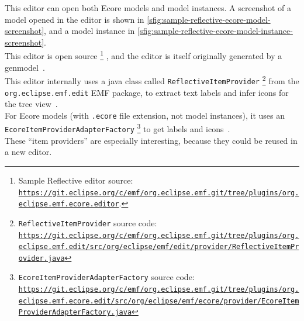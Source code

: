 This editor can open both \gls{Ecore} models and model instances.
A screenshot of a model opened in the editor is shown in \cref{sfig:sample-reflective-ecore-model-screenshot}, and a model instance in \cref{sfig:sample-reflective-ecore-model-instance-screenshot}.\\

This editor is \gls{open source}%
\footnote{Sample Reflective editor source: \href{https://git.eclipse.org/c/emf/org.eclipse.emf.git/tree/plugins/org.eclipse.emf.ecore.editor}{\nolinkurl{https://git.eclipse.org/c/emf/org.eclipse.emf.git/tree/plugins/org.eclipse.emf.ecore.editor}}.}%
, and the editor is itself originally generated by a genmodel~\cite[p.~10]{rekstadModelingEnvironmentCloud2020}.\\

This editor internally uses a java class called \texttt{ReflectiveItemProvider}%
\footnote{\texttt{ReflectiveItemProvider} source code: \href{https://git.eclipse.org/c/emf/org.eclipse.emf.git/tree/plugins/org.eclipse.emf.edit/src/org/eclipse/emf/edit/provider/ReflectiveItemProvider.java}{\nolinkurl{https://git.eclipse.org/c/emf/org.eclipse.emf.git/tree/plugins/org.eclipse.emf.edit/src/org/eclipse/emf/edit/provider/ReflectiveItemProvider.java}}}
from the \texttt{org.eclipse.emf.edit} \acrshort{EMF} package, to extract text labels and infer icons for the tree view~\cite[p.~10]{rekstadModelingEnvironmentCloud2020}.\\

For \gls{Ecore} models (with \texttt{.ecore} file extension, not model instances), it uses an \texttt{EcoreItemProviderAdapterFactory}%
\footnote{\texttt{EcoreItemProviderAdapterFactory} source code: \href{https://git.eclipse.org/c/emf/org.eclipse.emf.git/tree/plugins/org.eclipse.emf.ecore.edit/src/org/eclipse/emf/ecore/provider/EcoreItemProviderAdapterFactory.java}{\nolinkurl{https://git.eclipse.org/c/emf/org.eclipse.emf.git/tree/plugins/org.eclipse.emf.ecore.edit/src/org/eclipse/emf/ecore/provider/EcoreItemProviderAdapterFactory.java}}}
to get labels and icons~\cite{edmerksEcoreEditorJava2021}.\\

These ``item providers'' are especially interesting, because they could be reused in a new editor.

